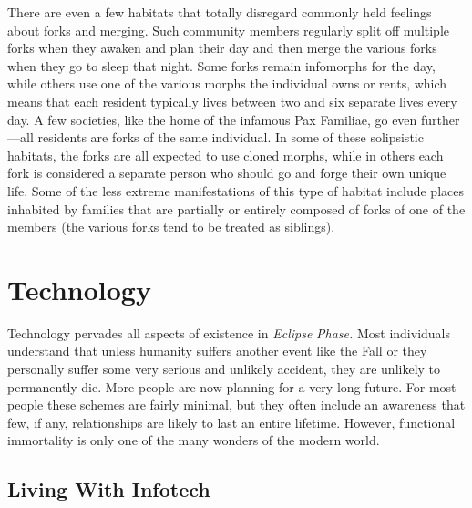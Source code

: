 There are even a few habitats that totally disregard 
commonly held feelings about forks and merging. 
Such community members regularly split off multiple
forks when they awaken and plan their day
and then merge the various forks when they go to 
sleep that night. Some forks remain infomorphs for 
the day, while others use one of the various morphs 
the individual owns or rents, which means that each 
resident typically lives between two and six separate 
lives every day. A few societies, like the home of the 
infamous Pax Familiae, go even further—all residents 
are forks of the same individual. In some of these 
solipsistic habitats, the forks are all expected to use 
cloned morphs, while in others each fork is considered
a separate person who should go and forge their
own unique life. Some of the less extreme manifestations
of this type of habitat include places inhabited
by families that are partially or entirely composed of 
forks of one of the members (the various forks tend to 
be treated as siblings).

\section{Technology}

Technology pervades all aspects of existence in \textit{Eclipse }
\textit{Phase.} Most individuals understand that unless humanity
suffers another event like the Fall or they personally
suffer some very serious and unlikely accident,
they are unlikely to permanently die. More people are 
now planning for a very long future. For most people 
these schemes are fairly minimal, but they often include
an awareness that few, if any, relationships are
likely to last an entire lifetime. However, functional 
immortality is only one of the many wonders of the 
modern world.

\subsection{Living With Infotech}

